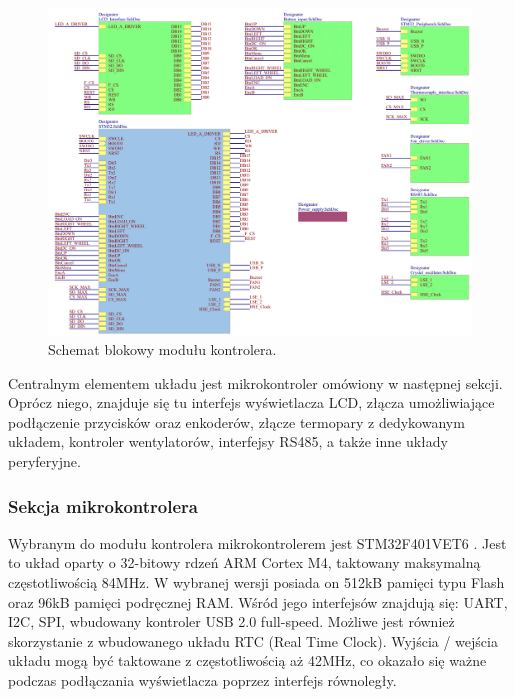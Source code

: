 \begin{figure}[h!]
    \begin{center}
        \includegraphics[width = 17cm]{images/schemat_blokowy_kontrolera_2.png}
        \caption{Schemat blokowy modułu kontrolera.}
        \label{fig:schematBlokowyKontrolera}
    \end{center}
\end{figure}

Centralnym elementem układu jest mikrokontroler omówiony w następnej sekcji. 
Oprócz niego, znajduje się tu interfejs wyświetlacza LCD, złącza umożliwiające podłączenie przycisków oraz enkoderów, złącze termopary z dedykowanym układem, kontroler wentylatorów,
interfejsy RS485, a także inne układy peryferyjne. 

\subsubsection{Sekcja mikrokontrolera}

Wybranym do modułu kontrolera mikrokontrolerem jest STM32F401VET6 \cite{stm32f401}. Jest to układ oparty o 
32-bitowy rdzeń ARM Cortex M4, taktowany maksymalną częstotliwością 84MHz. W wybranej wersji posiada on 
512kB pamięci typu Flash oraz 96kB pamięci podręcznej RAM. Wśród jego interfejsów znajdują się: UART, I2C, SPI, wbudowany kontroler USB 2.0 full-speed. Możliwe jest również 
skorzystanie z wbudowanego układu RTC (Real Time Clock). Wyjścia / wejścia układu mogą być taktowane z częstotliwością aż 42MHz, co okazało się ważne podczas podłączania wyświetlacza poprzez interfejs równoległy.

